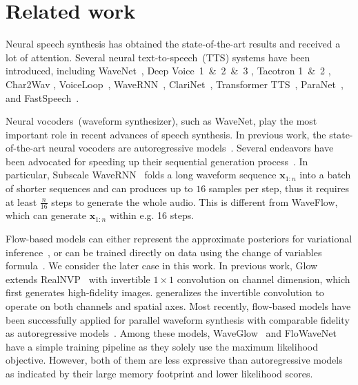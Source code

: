 \documentclass{article}
\newcommand{\vv}[1]{\boldsymbol{#1}}
\begin{document}
\vspace{-.3em}
\section{Related work}
\label{sec:related_work}
\vspace{-.1em}
Neural speech synthesis has obtained the state-of-the-art results and received a lot of attention. 
Several neural text-to-speech~(TTS) systems have been introduced, including WaveNet~\citep{oord2016wavenet}, Deep Voice~1~\&~2~\&~3 \citep{arik2017DV1, arik2017DV2, ping2017deep}, Tacotron 1~\&~2 \citep{wang2017tacotron, shen2018tacotron2}, Char2Wav \citep{sotelo2017char2wav}, VoiceLoop~\citep{taigman2018voiceloop}, WaveRNN~\citep{kalchbrenner2018efficient}, ClariNet~\citep{ping2018clarinet}, Transformer TTS~\citep{li2019neural}, ParaNet~\citep{peng2019parallel}, and FastSpeech~\citep{ren2019fastspeech}.

Neural vocoders~(waveform synthesizer), such as WaveNet,  play the most important role in recent advances of speech synthesis. 
In previous work, the state-of-the-art neural vocoders are autoregressive models~\citep{oord2016wavenet, mehri2016samplernn, kalchbrenner2018efficient}.
Several endeavors have been advocated for speeding up their sequential generation process~\citep{arik2017DV1, kalchbrenner2018efficient}.
In particular, Subscale WaveRNN~\citep{kalchbrenner2018efficient} folds a long waveform sequence $\vv x_{1:n}$ into a batch of shorter sequences and can produces up to $16$ samples per step, thus it requires at least $\frac{n}{16}$ steps to generate the whole audio.
This is different from WaveFlow, which can generate $\vv x_{1:n}$ within e.g. 16 steps.


Flow-based models can either represent the approximate posteriors for variational inference~\citep{rezende2015variational, kingma2016improved, berg2018sylvester}, or can be trained directly on data using the change of variables formula~\citep{dinh2014nice,dinh2016density,kingma2018glow}.
We consider the later case in this work.
In previous work, Glow~\citep{kingma2018glow} extends RealNVP~\citep{dinh2016density} with invertible $1\times1$ convolution on channel dimension, which first generates high-fidelity images. 
\citet{hoogeboom2019emerging} generalizes the  invertible convolution to operate on both channels and spatial axes.
Most recently, flow-based models have been successfully applied for parallel waveform synthesis with comparable fidelity as autoregressive models~\citep{oord2017parallel, ping2018clarinet, yamamoto2019probability, prenger2019waveglow, kim2018flowavenet, serra2019blow}.
Among these models, WaveGlow~\citep{prenger2019waveglow} and FloWaveNet~\citep{kim2018flowavenet} have a simple training pipeline as they solely use the maximum likelihood objective.
However, both of them are less expressive than autoregressive models as indicated by their large memory footprint and lower likelihood scores.
\end{document}
